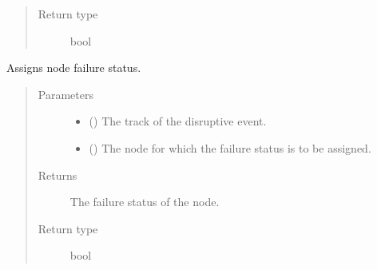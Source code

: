 \documentclass[letterpaper,10pt,english]{sphinxmanual}
\begin{document}
\begin{fulllineitems}
\begin{fulllineitems}
\begin{quote}
\begin{description}
\item[{Return type}] \leavevmode
\sphinxAtStartPar
bool

\end{description}\end{quote}

\end{fulllineitems}


\begin{fulllineitems}
\label{\detokenize{apidoc:dreaminsg_integrated_model.src.hazard_initiator.TrackDisruption.assign_node_failure}}
\sphinxAtStartPar
Assigns node failure status.
\begin{quote}\begin{description}
\item[{Parameters}] \leavevmode\begin{itemize}
\item {} 
\sphinxAtStartPar
{} () \textendash{} The track of the disruptive event.

\item {} 
\sphinxAtStartPar
{} () \textendash{} The node for which the failure status is to be assigned.

\end{itemize}

\item[{Returns}] \leavevmode
\sphinxAtStartPar
The failure status of the node.

\item[{Return type}] \leavevmode
\sphinxAtStartPar
bool

\end{description}\end{quote}

\end{fulllineitems}



\end{fulllineitems}
\end{document}
